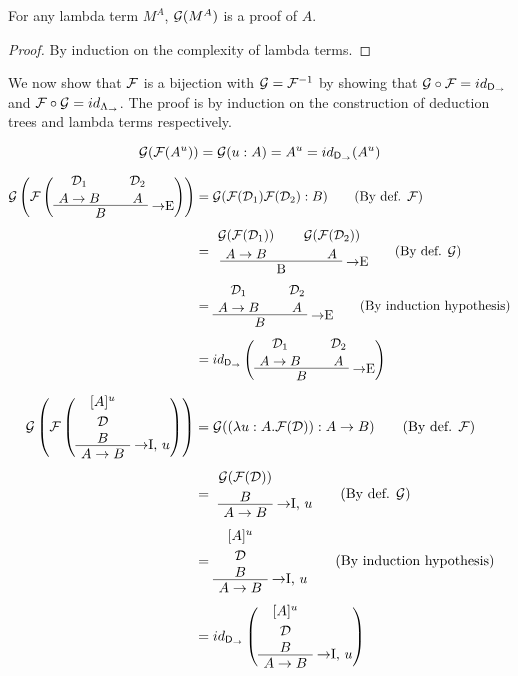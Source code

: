 \begin{proposition}
For any lambda term $M^A$, $\mathcal{G}(M^A)$ is a proof of $A$.
\end{proposition}

\begin{proof}
By induction on the complexity of lambda terms.
\end{proof}

We now show that $\mathcal{F}$ is a bijection with $\mathcal{G} = \mathcal{F}^{-1}$ by
showing that $\mathcal{G} \circ \mathcal{F} = id_{\mathsf{D}_\to}$ and $\mathcal{F} \circ
\mathcal{G} = id_{\Lambda_\to}$. The proof is by induction on the construction
of deduction trees and lambda terms respectively.

\[
\mathcal{G}(\mathcal{F}(A^u)) = \mathcal{G}(u:A) = A^u = id_{\mathsf{D}_\to}(A^u)
\]

\begin{align*}
\chmapanta\left(\chmap\left(
  \AxiomC{$\mathcal{D}_1$}
  \noLine
  \UnaryInfC{$A \to B$}
  \AxiomC{$\mathcal{D}_2$}
  \noLine
  \UnaryInfC{$A$}
  \RightLabel{$\to$E}
  \BinaryInfC{$B$}
  \DisplayProof
\right)\right)
& =
  \chmapanta(\chmap(\mathcal{D}_1) \chmap(\mathcal{D}_2): B)
  \tag{By def. $\chmap$} \\[0.5em]
& =
  \AxiomC{$\chmapanta(\chmap(\mathcal{D}_1))$}
  \noLine
  \UnaryInfC{$A \to B$}
  \AxiomC{$\chmapanta(\chmap(\mathcal{D}_2))$}
  \noLine
  \UnaryInfC{$A$}
  \RightLabel{$\to$E}
  \BinaryInfC{B}
  \DisplayProof \tag{By def. $\chmapanta$} \\[0.5em]
& =
  \AxiomC{$\mathcal{D}_1$}
  \noLine
  \UnaryInfC{$A \to B$}
  \AxiomC{$\mathcal{D}_2$}
  \noLine
  \UnaryInfC{$A$}
  \RightLabel{$\to$E}
  \BinaryInfC{$B$}
  \DisplayProof \tag{By induction hypothesis} \\[0.5em]
& =
  id_{\npiproofs}\left(
  \AxiomC{$\mathcal{D}_1$}
  \noLine
  \UnaryInfC{$A \to B$}
  \AxiomC{$\mathcal{D}_2$}
  \noLine
  \UnaryInfC{$A$}
  \RightLabel{$\to$E}
  \BinaryInfC{$B$}
  \DisplayProof
  \right)
\end{align*}

\begin{align*}
\chmapanta\left(\chmap\left(
  \AxiomC{$[A]^u$}
  \noLine
  \UnaryInfC{$\mathcal{D}$}
  \noLine
  \UnaryInfC{$B$}
  \RightLabel{$\to$I, $u$}
  \UnaryInfC{$A \to B$}
  \DisplayProof
\right)\right)
& =
  \chmapanta((\lambda u: A.\chmap(\mathcal{D})): A \to B)
  \tag{By def. $\chmap$} \\[0.5em]
& =
  \AxiomC{$\chmapanta(\chmap(\mathcal{D}))$}
  \noLine
  \UnaryInfC{$B$}
  \RightLabel{$\to$I, $u$}
  \UnaryInfC{$A \to B$}
  \DisplayProof \tag{By def. $\chmapanta$} \\[0.5em]
& =
  \AxiomC{$[A]^u$}
  \noLine
  \UnaryInfC{$\mathcal{D}$}
  \noLine
  \UnaryInfC{$B$}
  \RightLabel{$\to$I, $u$}
  \UnaryInfC{$A \to B$}
  \DisplayProof \tag{By induction hypothesis} \\[0.5em]
& =
  id_{\npiproofs}\left(
  \AxiomC{$[A]^u$}
  \noLine
  \UnaryInfC{$\mathcal{D}$}
  \noLine
  \UnaryInfC{$B$}
  \RightLabel{$\to$I, $u$}
  \UnaryInfC{$A \to B$}
  \DisplayProof
  \right)
\end{align*}

